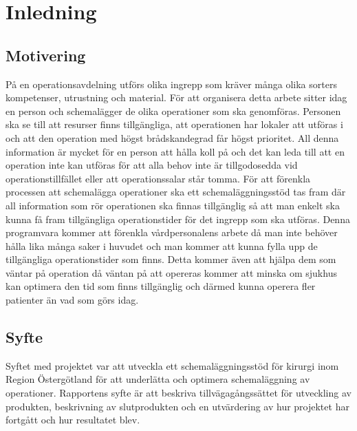 \chapter{Inledning}

\section{Motivering}
På en operationsavdelning utförs olika ingrepp som kräver många olika sorters kompetenser, utrustning och material. För att organisera detta arbete sitter idag en person och schemalägger de olika operationer som ska genomföras. Personen ska se till att resurser finns tillgängliga, att operationen har lokaler att utföras i och att den operation med högst brådskandegrad får högst prioritet. All denna information är mycket för en person att hålla koll på och det kan leda till att en operation inte kan utföras för att alla behov inte är tillgodosedda vid operationstillfället eller att operationssalar står tomma.
För att förenkla processen att schemalägga operationer ska ett schemaläggningsstöd tas fram där all information som rör operationen ska finnas tillgänglig så att man enkelt ska kunna få fram tillgängliga operationstider för det ingrepp som ska utföras. Denna programvara kommer att förenkla vårdpersonalens arbete då man inte behöver hålla lika många saker i huvudet och man kommer att kunna fylla upp de tillgängliga operationstider som finns. Detta kommer även att hjälpa dem som väntar på operation då väntan på att opereras kommer att minska om sjukhus kan optimera den tid som finns tillgänglig och därmed kunna operera fler patienter än vad som görs idag.

\section{Syfte}
Syftet med projektet var att utveckla ett schemaläggningsstöd för kirurgi inom Region Östergötland för att underlätta och optimera schemaläggning av operationer.
Rapportens syfte är att beskriva tillvägagångssättet för utveckling av produkten, beskrivning av slutprodukten och en utvärdering av hur projektet har fortgått och hur resultatet blev.


